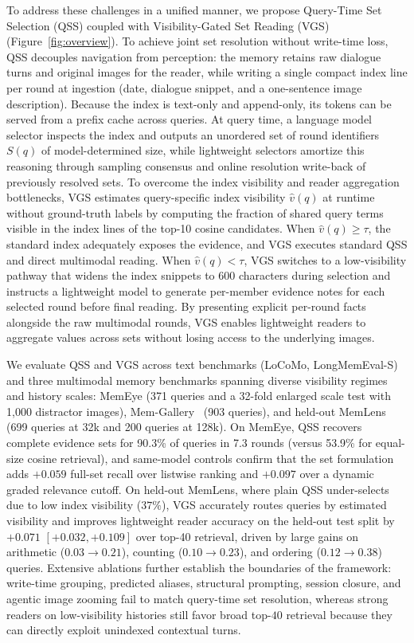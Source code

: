 \documentclass[10pt]{article}
\newcommand{\qss}{QSS}
\begin{document}
To address these challenges in a unified manner, we propose Query-Time Set Selection (\qss{}) coupled with Visibility-Gated Set Reading (VGS) (Figure~\ref{fig:overview}). To achieve joint set resolution without write-time loss, \qss{} decouples navigation from perception: the memory retains raw dialogue turns and original images for the reader, while writing a single compact index line per round at ingestion (date, dialogue snippet, and a one-sentence image description). Because the index is text-only and append-only, its tokens can be served from a prefix cache across queries. At query time, a language model selector inspects the index and outputs an unordered set of round identifiers $S(q)$ of model-determined size, while lightweight selectors amortize this reasoning through sampling consensus and online resolution write-back of previously resolved sets. To overcome the index visibility and reader aggregation bottlenecks, VGS estimates query-specific index visibility $\hat{v}(q)$ at runtime without ground-truth labels by computing the fraction of shared query terms visible in the index lines of the top-10 cosine candidates. When $\hat{v}(q) \ge \tau$, the standard index adequately exposes the evidence, and VGS executes standard \qss{} and direct multimodal reading. When $\hat{v}(q) < \tau$, VGS switches to a low-visibility pathway that widens the index snippets to 600 characters during selection and instructs a lightweight model to generate per-member evidence notes for each selected round before final reading. By presenting explicit per-round facts alongside the raw multimodal rounds, VGS enables lightweight readers to aggregate values across sets without losing access to the underlying images.

We evaluate \qss{} and VGS across text benchmarks (LoCoMo, LongMemEval-S) and three multimodal memory benchmarks spanning diverse visibility regimes and history scales: MemEye (371 queries and a 32-fold enlarged scale test with 1,000 distractor images), Mem-Gallery~\citep{bei2026memgallery} (903 queries), and held-out MemLens (699 queries at 32k and 200 queries at 128k). On MemEye, \qss{} recovers complete evidence sets for 90.3\% of queries in 7.3 rounds (versus 53.9\% for equal-size cosine retrieval), and same-model controls confirm that the set formulation adds $+0.059$ full-set recall over listwise ranking and $+0.097$ over a dynamic graded relevance cutoff. On held-out MemLens, where plain \qss{} under-selects due to low index visibility ($37\%$), VGS accurately routes queries by estimated visibility and improves lightweight reader accuracy on the held-out test split by $+0.071$ $[+0.032, +0.109]$ over top-40 retrieval, driven by large gains on arithmetic ($0.03 \to 0.21$), counting ($0.10 \to 0.23$), and ordering ($0.12 \to 0.38$) queries. Extensive ablations further establish the boundaries of the framework: write-time grouping, predicted aliases, structural prompting, session closure, and agentic image zooming fail to match query-time set resolution, whereas strong readers on low-visibility histories still favor broad top-$40$ retrieval because they can directly exploit unindexed contextual turns.
\end{document}
